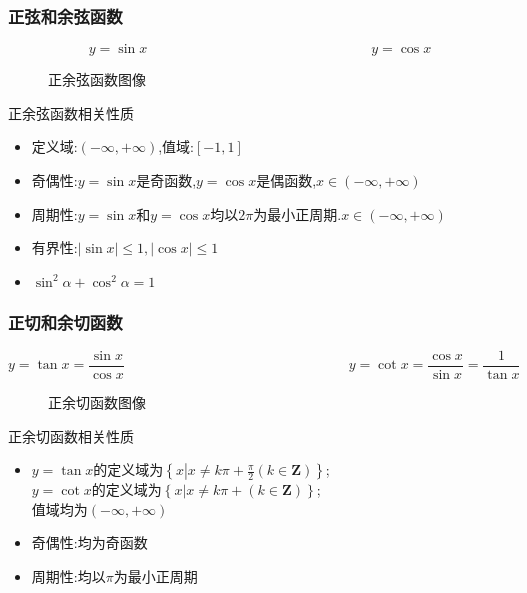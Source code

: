 \documentclass[12pt, a4paper, oneside, UTF8]{ctexbook}  %
\begin{document}
\begin{sloppypar}
    \subsubsection{正弦和余弦函数}
    $$
        \boxed{y=\sin x}
        \qquad \qquad \qquad \qquad \qquad \qquad \qquad \qquad
        \boxed{y=\cos x}
    $$
    \begin{figure}[H] \centering
        \caption{正余弦函数图像}
    \end{figure}
    \begin{criterion}{正余弦函数相关性质}{}
        \begin{itemize}
            \item 定义域:$(-\infty,+\infty)$,值域:$[-1,1]$
            \item 奇偶性:$y=\sin x$是奇函数,$y=\cos x$是偶函数,$x\in (-\infty,+\infty)$
            \item 周期性:$y=\sin x$和$y=\cos x$均以$2\pi$为最小正周期.$x\in (-\infty,+\infty)$
            \item 有界性:$\left|\sin x\right|\leqslant1,\left|\cos x\right|\leqslant1$
            \item $\sin^{2}\alpha+\cos^{2}\alpha=1$
        \end{itemize}
    \end{criterion}
    \subsubsection{正切和余切函数}
    $$
        \boxed{y=\tan x=\frac{\sin x}{\cos x}}
        \qquad \qquad \qquad \qquad \qquad \qquad \qquad \qquad
        \boxed{y=\cot x=\frac{\cos x}{\sin x}=\frac{1}{\tan x}}
    $$
    \begin{figure}[H] \centering
        \caption{正余切函数图像}
    \end{figure}
    \begin{criterion}{正余切函数相关性质}{}
        \begin{itemize}
            \item $y=\tan x$的定义域为$\left\{x\left|x\neq k\pi+\frac{\pi}{2}\left(k\in\mathbf{Z}\right)\right\}\right.$;\\$y=\cot x$的定义域为$\left\{x\left|x\neq k\pi+\left(k\in\mathbf{Z}\right)\right\}\right.$;\\
                      值域均为$(-\infty,+\infty)$
            \item 奇偶性:均为奇函数
            \item 周期性:均以$\pi$为最小正周期
        \end{itemize}
    \end{criterion}


\end{sloppypar}
\end{document}
